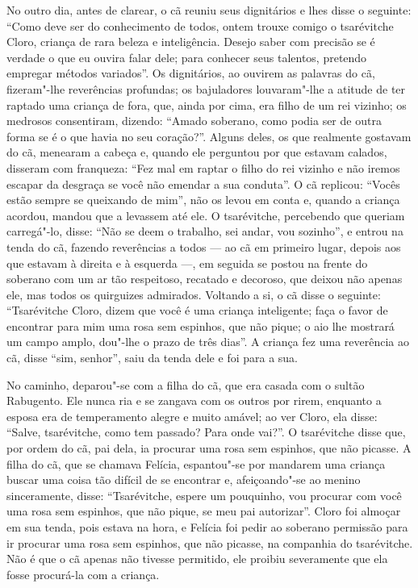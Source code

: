No outro dia, antes de clarear, o cã reuniu seus dignitários e lhes
disse o seguinte: ``Como deve ser do conhecimento de todos, ontem trouxe
comigo o tsarévitche Cloro, criança de rara beleza e inteligência.
Desejo saber com precisão se é verdade o que eu ouvira falar dele; para
conhecer seus talentos, pretendo empregar métodos variados''. Os
dignitários, ao ouvirem as palavras do cã, fizeram"-lhe reverências
profundas; os bajuladores louvaram"-lhe a atitude de ter raptado uma criança de fora, que, ainda por cima, era filho de um rei vizinho; os medrosos
consentiram, dizendo: ``Amado soberano, como podia ser de outra forma se
é o que havia no seu coração?''. Alguns deles, os que realmente gostavam
do cã, menearam a cabeça e, quando ele perguntou por que estavam
calados, disseram com franqueza: ``Fez mal em raptar o filho do rei
vizinho e não iremos escapar da desgraça se você não emendar a sua
conduta''. O cã replicou: ``Vocês estão sempre se queixando de mim'',
não os levou em conta e, quando a criança acordou, mandou que a levassem
até ele. O tsarévitche, percebendo que queriam carregá"-lo, disse: ``Não
se deem o trabalho, sei andar, vou sozinho'', e entrou na tenda do cã,
fazendo reverências a todos --- ao cã em primeiro lugar, depois aos que
estavam à direita e à esquerda ---, em seguida se postou na frente do
soberano com um ar tão respeitoso, recatado e decoroso, que deixou não
apenas ele, mas todos os quirguizes admirados. Voltando a si, o cã disse
o seguinte: ``Tsarévitche Cloro, dizem que você é uma criança
inteligente; faça o favor de encontrar para mim uma rosa sem espinhos,
que não pique; o aio lhe mostrará um campo amplo, dou"-lhe o prazo de
três dias''. A criança fez uma reverência ao cã, disse ``sim, senhor'',
saiu da tenda dele e foi para a sua.

No caminho, deparou"-se com a filha do cã, que era casada com o sultão
Rabugento. Ele nunca ria e se zangava com os outros por rirem, enquanto
a esposa era de temperamento alegre e muito amável; ao ver Cloro, ela
disse: ``Salve, tsarévitche, como tem passado? Para onde vai?''. O
tsarévitche disse que, por ordem do cã, pai dela, ia procurar uma rosa
sem espinhos, que não picasse. A filha do cã, que se chamava Felícia,
espantou"-se por mandarem uma criança buscar uma coisa tão difícil de se
encontrar e, afeiçoando"-se ao menino sinceramente, disse: ``Tsarévitche,
espere um pouquinho, vou procurar com você uma rosa sem espinhos, que
não pique, se meu pai autorizar''. Cloro foi almoçar em sua tenda, pois
estava na hora, e Felícia foi pedir ao soberano permissão para ir
procurar uma rosa sem espinhos, que não picasse, na companhia do
tsarévitche. Não é que o cã apenas não tivesse permitido, ele proibiu
severamente que ela fosse procurá-la com a criança.

